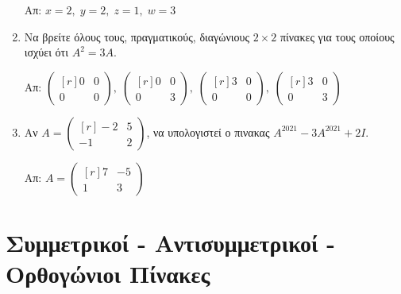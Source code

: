 \begin{enumerate}
  \hfill Απ: $ x=2, \; y=2, \; z=1, \; w=3 $ 

\item Να βρείτε όλους τους, πραγματικούς, διαγώνιους $ 2 \times 2 $ πίνακες για τους 
  οποίους ισχύει ότι $ A^{2}=3A $.

  \hfill Απ: $\scriptstyle{ 
  \begin{pmatrix*}[r]
    0 & 0 \\
    0 &0
  \end{pmatrix*}, \; 
  \begin{pmatrix*}[r]
    0 & 0 \\
    0 & 3
  \end{pmatrix*}, \; 
  \begin{pmatrix*}[r]
    3 & 0 \\
    0 & 0
  \end{pmatrix*}, \; 
  \begin{pmatrix*}[r]
    3 & 0 \\
    0 & 3
\end{pmatrix*}} $
  

\item Αν $ A = 
  \begin{pmatrix*}[r]
    -2 & 5 \\
    -1 & 2
  \end{pmatrix*} $, να υπολογιστεί ο πινακας $ A^{2021} - 3A^{2021} +2I $. 

  \hfill Απ: $ A = 
  \begin{pmatrix*}[r]
    7 & -5 \\
    1 & 3
  \end{pmatrix*} $ 
\end{enumerate}

\section*{Συμμετρικοί - Αντισυμμετρικοί - Ορθογώνιοι Πίνακες}

